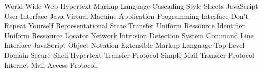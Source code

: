 \begin{acronym}[HTML]
			{World Wide Web}
			{Hypertext Markup Language}
			{Cascading Style Sheets}
			{JavaScript}
			{User Interface}
			{Java Virtual Machine}
   			{Application Programming Interface}
	      {Don't Repeat Yourself}
	     {Representational State Transfer}
	      {Uniform Ressource Identifier}
	      {Uniform Ressource Locator}
	     {Network Intrusion Detection System}
	      {Command Line Interface}
	     {JavaScript Object Notation}
	      {Extensible Markup Language}
			{Top-Level Domain}
			{Secure Shell}
			{Hypertext Transfer Protocol}
			{Simple Mail Transfer Protocol}
			{Internet Mail Access Protocoll}
\end{acronym}
